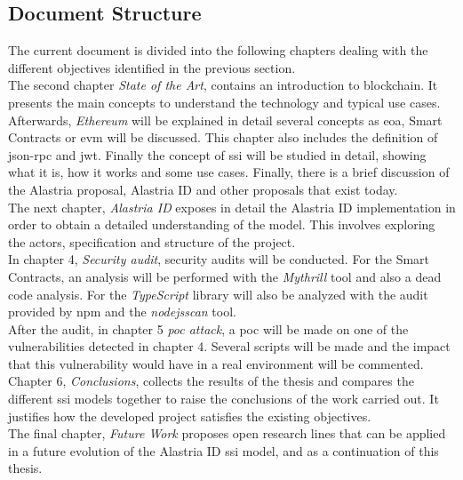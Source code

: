 \subsection{Document Structure}
The current document is divided into the following chapters dealing with the different objectives identified in the previous section.\\

The second chapter \textit{State of the Art}, contains an introduction to blockchain. It presents the main concepts to understand the technology and typical use cases. Afterwards, \textit{Ethereum} will be explained in detail several concepts as \acrlong{eoa}, Smart Contracts or \acrlong{evm} will be discussed. This chapter also includes the definition of \acrshort{json}-\acrshort{rpc} and \acrfull{jwt}. Finally the concept of \acrlong{ssi} will be studied in detail, showing what it is, how it works and some use cases. Finally, there is a brief discussion of the Alastria proposal, Alastria ID and other proposals that exist today.\\

The next chapter, \textit{Alastria ID} exposes in detail the Alastria ID implementation in order to obtain a detailed understanding of the model. This involves exploring the actors, specification and structure of the project.\\

In chapter 4, \textit{Security audit}, security audits will be conducted. For the Smart Contracts, an analysis will be performed with the \textit{Mythrill} tool and also a dead code analysis. For the \textit{TypeScript} library will also be analyzed with the audit provided by \acrshort{npm} and the \textit{nodejsscan} tool.\\

After the audit, in chapter 5 \textit{\acrshort{poc} attack}, a \acrlong{poc} will be made on one of the vulnerabilities detected in chapter 4. Several scripts will be made and the impact that this vulnerability would have in a real environment will be commented.\\

Chapter 6, \textit{Conclusions}, collects the results of the thesis and compares the different \acrshort{ssi} models together to raise the conclusions of the work carried out. It justifies how the developed project satisfies the existing objectives.\\

The final chapter, \textit{Future Work} proposes open research lines that can be applied in a future evolution of the Alastria ID \acrshort{ssi} model, and as a continuation of this thesis.
